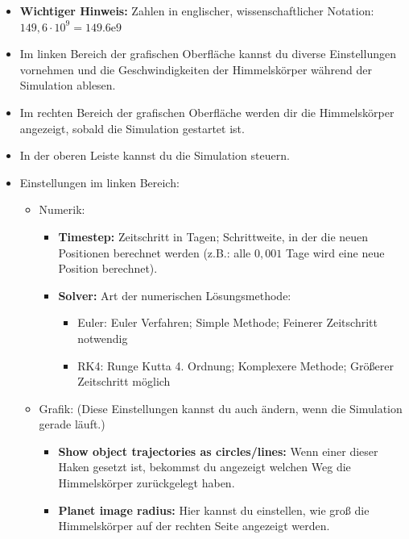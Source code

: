 \documentclass{scrartcl}
\begin{document}
        \begin{itemize}[leftmargin=*]
            \setlength\itemsep{0em}
            \item \textbf{\color{red}Wichtiger Hinweis:} Zahlen in englischer, wissenschaftlicher Notation: $149,6\cdot10^9 = 149.6\mathrm{e}9$
            \item Im linken Bereich der grafischen Oberfläche kannst du diverse Einstellungen vornehmen und die Geschwindigkeiten der Himmelskörper während der Simulation ablesen.
            \item Im rechten Bereich der grafischen Oberfläche werden dir die Himmelskörper angezeigt, sobald die Simulation gestartet ist.
            \item In der oberen Leiste kannst du die Simulation steuern.
            \item Einstellungen im linken Bereich:
                \begin{itemize}
                    \item Numerik:
                    \begin{itemize}
                        \item \textbf{Timestep:} Zeitschritt in Tagen; Schrittweite, in der die neuen Positionen berechnet werden (z.B.: alle $0,001$ Tage wird eine neue Position berechnet).
                        \item \textbf{Solver:} Art der numerischen Lösungsmethode:
                        \begin{itemize}
                            \item Euler: Euler Verfahren; Simple Methode; Feinerer Zeitschritt notwendig
                            \item RK4: Runge Kutta 4. Ordnung; Komplexere Methode; Größerer Zeitschritt möglich
                        \end{itemize}
                    \end{itemize}
                    \item Grafik:
                    (Diese Einstellungen kannst du auch ändern, wenn die Simulation gerade läuft.)
                    \begin{itemize}
                    \item \textbf{Show object trajectories as circles/lines:} Wenn einer dieser Haken gesetzt ist, bekommst du angezeigt welchen Weg die Himmelskörper zurückgelegt haben. 
                    \item \textbf{Planet image radius:} Hier kannst du einstellen, wie groß die Himmelskörper auf der rechten Seite angezeigt werden. 

\end{itemize}
\end{itemize}
\end{itemize}
\end{document}

